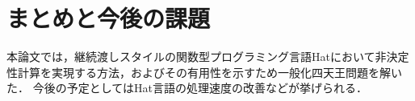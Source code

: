 \documentclass[10pt,a4j,twocolumn,oneside]{jsarticle}
\begin{document}
\section{まとめと今後の課題}

本論文では，継続渡しスタイルの関数型プログラミング言語Hatにおいて非決定性計算を実現する方法，およびその有用性を示すため一般化四天王問題を解いた．
今後の予定としてはHat言語の処理速度の改善などが挙げられる．

% 
% 

% 
% 
\small

\end{document}
